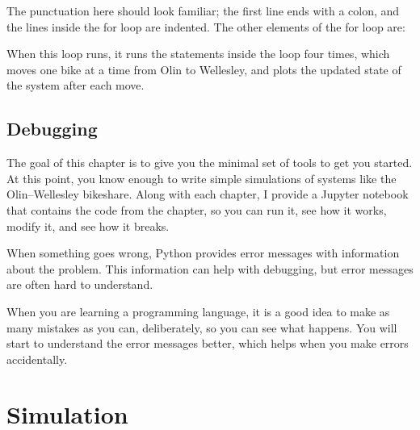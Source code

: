 \documentclass[12pt]{book}
\theoremstyle{exercise}
\newcommand{\py}{\verb}%}
\begin{document}
The punctuation here should look familiar; the first line ends with a colon, and the lines inside the for loop are indented.  The other elements of the for loop are:


When this loop runs, it runs the statements inside the loop four times, 
which moves one bike at a time from Olin to Wellesley, and plots the updated state of the system after each move.


\section{Debugging}

The goal of this chapter is to give you the minimal set of tools to get you started.  At this point, you know enough to write simple simulations of systems like the Olin--Wellesley bikeshare.  Along with each chapter, I provide a Jupyter notebook that contains the code from the chapter, so you can run it, see how it works, modify it, and see how it breaks.

When something goes wrong, Python provides error messages with information about the problem.  This information can help with debugging, but error messages are often hard to understand.

When you are learning a programming language, it is a good idea to make as many mistakes as you can, deliberately, so you can see what happens.  You will start to understand the error messages better, which helps when you make errors accidentally.



\chapter{Simulation}
\end{document}
